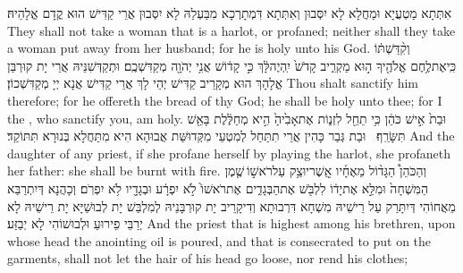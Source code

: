 {אִתְּתָא מַטְעֲיָא וּמַחֲלָא לָא יִסְּבוּן וְאִתְּתָא דִּמְתָרְכָא מִבַּעְלַהּ לָא יִסְּבוּן אֲרֵי קַדִּישׁ הוּא קֳדָם אֱלָהֵיהּ׃}
{They shall not take a woman that is a harlot, or profaned; neither shall they take a woman put away from her husband; for he is holy unto his God.}{}
{וְקִ֨דַּשְׁתּ֔וֹ כִּֽי\maqqaf אֶת\maqqaf לֶ֥חֶם אֱלֹהֶ֖יךָ ה֣וּא מַקְרִ֑יב קָדֹשׁ֙ יִֽהְיֶה\maqqaf לָּ֔ךְ כִּ֣י קָד֔וֹשׁ אֲנִ֥י יְהֹוָ֖ה מְקַדִּשְׁכֶֽם׃}
{וּתְקַדְּשִׁנֵּיהּ אֲרֵי יָת קוּרְבַּן אֱלָהָךְ הוּא מְקָרֵיב קַדִּישׁ יְהֵי לָךְ אֲרֵי קַדִּישׁ אֲנָא יְיָ מְקַדִּשְׁכוֹן׃}
{Thou shalt sanctify him therefore; for he offereth the bread of thy God; he shall be holy unto thee; for I the \lord, who sanctify you, am holy.}{}
{וּבַת֙ אִ֣ישׁ כֹּהֵ֔ן כִּ֥י תֵחֵ֖ל לִזְנ֑וֹת אֶת\maqqaf אָבִ֙יהָ֙ הִ֣יא מְחַלֶּ֔לֶת בָּאֵ֖שׁ תִּשָּׂרֵֽף׃ \setuma }
{וּבַת גְּבַר כָּהִין אֲרֵי תִתַּחַל לְמִטְעֵי מִקְּדוּשַּׁת אֲבוּהָא הִיא מִתַּחֲלָא בְּנוּרָא תִּתּוֹקַד׃}
{And the daughter of any priest, if she profane herself by playing the harlot, she profaneth her father: she shall be burnt with fire.}{}
{וְהַכֹּהֵן֩ הַגָּד֨וֹל מֵאֶחָ֜יו אֲֽשֶׁר\maqqaf יוּצַ֥ק עַל\maqqaf רֹאשׁ֣וֹ \legarmeh  שֶׁ֤מֶן הַמִּשְׁחָה֙ וּמִלֵּ֣א אֶת\maqqaf יָד֔וֹ לִלְבֹּ֖שׁ אֶת\maqqaf הַבְּגָדִ֑ים אֶת\maqqaf רֹאשׁוֹ֙ לֹ֣א יִפְרָ֔ע וּבְגָדָ֖יו לֹ֥א יִפְרֹֽם׃}
{וְכָהֲנָא דְּיִתְרַבַּא מֵאֲחוֹהִי דְּיִתָּרַק עַל רֵישֵׁיהּ מִשְׁחָא דִּרְבוּתָא וְדִיקָרֵיב יָת קוּרְבָּנֵיהּ לְמִלְבַּשׁ יָת לְבוּשַׁיָּא יָת רֵישֵׁיהּ לָא יְרַבֵּי פֵירוּעַ וּלְבוּשׁוֹהִי לָא יְבַזַּע׃}
{And the priest that is highest among his brethren, upon whose head the anointing oil is poured, and that is consecrated to put on the garments, shall not let the hair of his head go loose, nor rend his clothes;}{}
